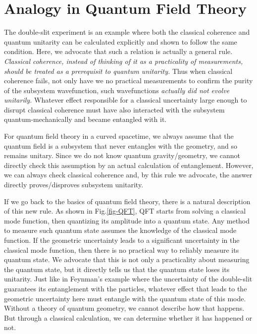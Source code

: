 \documentclass[aps,showpacs,onecolumn,floats,prd,superscriptaddress,nofootinbib]{revtex4-1}
\begin{document}
\section{Analogy in Quantum Field Theory}
\label{sec-QFT}

The double-slit experiment is an example where both the classical coherence and quantum unitarity can be calculated explicitly and shown to follow the same condition.
Here, we advocate that such a relation is actually a general rule.
{\it Classical coherence, instead of thinking of it as a practicality of measurements, should be treated as a prerequisit to quantum unitarity.} 
Thus when classical coherence fails, not only have we no practical measurements to confirm the purity of the subsystem wavefunction, such wavefunctions {\it actually did not evolve unitarily.}
Whatever effect responsible for a classical uncertainty large enough to disrupt classical coherence must have also interacted with the subsystem quantum-mechanically and became entangled with it.

For quantum field theory in a curved spacetime, we always assume that the quantum field is a subsystem that never entangles with the geometry, and so remains unitary.
Since we do not know quantum gravity/geometry, we cannot directly check this assumption by an actual calculation of entanglement.
However, we can always check classical coherence and, by this rule we advocate, the answer directly proves/disproves subsystem unitarity.

If we go back to the basics of quantum field theory, there is a natural description of this new rule. 
As shown in Fig.\ref{fig-QFT}, QFT starts from solving a classical mode function, then quantizing its amplitude into a quantum state. 
Any method to measure such quantum state assumes the knowledge of the classical mode function. 
If the geometric uncertainty leads to a significant uncertainty in the classical mode function, then there is no practical way to reliably measure its quantum state. 
We advocate that this is not only a practicality about measuring the quantum state, but it directly tells us that the quantum state loses its unitarity. 
Just like in Feynman's example where the uncertainty of the double-slit guarantees its entanglement with the particles, whatever effect that leads to the geometric uncertainty here must entangle with the quantum state of this mode. 
Without a theory of quantum geometry, we cannot describe how that happens. 
But through a classical calculation, we can determine whether it has happened or not.
\end{document}
